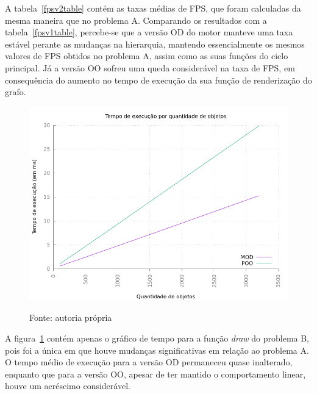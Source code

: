 A tabela~\ref{fpsv2table} contém as taxas médias de FPS, que foram calculadas da 
mesma maneira que no problema A. Comparando os resultados com a 
tabela~\ref{fpsv1table}, percebe-se que a versão OD do motor manteve uma taxa 
estável perante as mudanças na hierarquia, mantendo essencialmente os mesmos valores 
de FPS obtidos no problema A, assim como as suas funções do ciclo principal. Já a 
versão OO sofreu uma queda considerável na taxa de FPS, em consequência do aumento 
no tempo de execução da sua função de renderização do grafo.


\begin{figure}[h!]
    \centering
    \includegraphics[width =\textwidth]{../figuras/drawv2graph}
    \par\medskip
    Fonte: autoria própria
    \label{drawv2graph}
\end{figure}

A figura~\ref{drawv2graph} contém apenas o gráfico de tempo 
para a função \textit{draw} do problema B, pois foi a única em 
que houve mudanças significativas em relação ao problema A. O 
tempo médio de execução para a versão OD permaneceu quase 
inalterado, enquanto que para a versão OO, apesar de ter 
mantido o comportamento linear, houve um acréscimo considerável.

